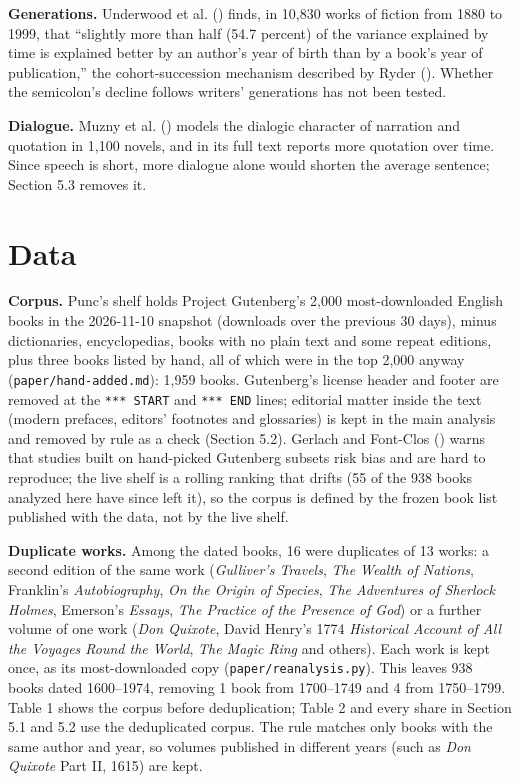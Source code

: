 \documentclass[
  11pt,
]{article}
\begin{document}
\textbf{Generations.} Underwood et al. () finds, in 10,830 works of fiction from 1880 to 1999, that ``slightly more than half (54.7 percent) of the variance explained
by time is explained better by an author's year of birth than by a book's year of publication,'' the cohort-succession mechanism described by Ryder (). Whether the
semicolon's decline follows writers' generations has not been tested.

\textbf{Dialogue.} Muzny et al. () models the dialogic character of narration and quotation in 1,100 novels, and in its full text reports more quotation over time. Since
speech is short, more dialogue alone would shorten the average sentence; Section 5.3 removes it.

\section{Data}\label{data}

\textbf{Corpus.} Punc's shelf holds Project Gutenberg's 2,000 most-downloaded English books in the 2026-11-10 snapshot (downloads over the previous 30 days), minus dictionaries, encyclopedias, books
with no plain text and some repeat editions, plus three books listed by hand, all of which were in the top 2,000 anyway (\texttt{paper/hand-added.md}): 1,959 books. Gutenberg's license header and
footer are removed at the \texttt{***\ START} and \texttt{***\ END} lines; editorial matter inside the text (modern prefaces, editors' footnotes and glossaries) is kept in the main analysis and
removed by rule as a check (Section 5.2). Gerlach and Font-Clos () warns that studies built on hand-picked Gutenberg subsets risk bias and are hard to reproduce; the
live shelf is a rolling ranking that drifts (55 of the 938 books analyzed here have since left it), so the corpus is defined by the frozen book list published with the data, not by the live shelf.

\textbf{Duplicate works.} Among the dated books, 16 were duplicates of 13 works: a second edition of the same work (\emph{Gulliver's Travels}, \emph{The Wealth of Nations}, Franklin's
\emph{Autobiography}, \emph{On the Origin of Species}, \emph{The Adventures of Sherlock Holmes}, Emerson's \emph{Essays}, \emph{The Practice of the Presence of God}) or a further volume of one work
(\emph{Don Quixote}, David Henry's 1774 \emph{Historical Account of All the Voyages Round the World}, \emph{The Magic Ring} and others). Each work is kept once, as its most-downloaded copy
(\texttt{paper/reanalysis.py}). This leaves 938 books dated 1600--1974, removing 1 book from 1700--1749 and 4 from 1750--1799. Table 1 shows the corpus before deduplication; Table 2 and every share in
Section 5.1 and 5.2 use the deduplicated corpus. The rule matches only books with the same author and year, so volumes published in different years (such as \emph{Don Quixote} Part II, 1615) are kept.
\end{document}
